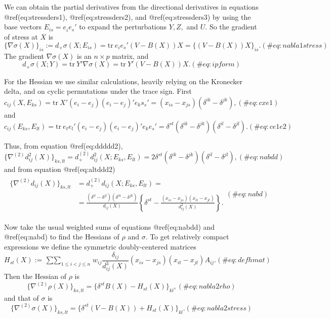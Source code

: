 \documentclass[
  12pt,
  letterpaper,
  DIV=11,
  numbers=noendperiod]{scrreprt}
\theoremstyle{remark}
\begin{document}
We can obtain the partial derivatives from the directional derivatives
in equations @ref(eq:stressders1), @ref(eq:stressders2), and
@ref(eq:stressders3) by using the base vectors \(E_{is}=e_i^{\ }e_s'\)
to expand the perturbations \(Y, Z,\) and \(U\). So the gradient of
stress at \(X\) is\\
\begin{equation}
\{\nabla\sigma(X)\}_{is}:=d_+\sigma(X;E_{is})=\text{tr}\ e_ie_s'(V-B(X))X=\{(V-B(X))X\}_{is}.
(\#eq:nabla1stress)
\end{equation} The gradient \(\nabla\sigma(X)\) is an \(n\times p\)
matrix, and \begin{equation}
d_+\sigma(X;Y)=\text{tr}\ Y'\nabla\sigma(X)=\text{tr}\ Y'(V-B(X))X.
(\#eq:ipform)
\end{equation}

For the Hessian we use similar calculations, heavily relying on the
Kronecker delta, and on cyclic permutations under the trace sign. First
\begin{equation}
c_{ij}(X,E_{ks})=\text{tr}\ X'(e_i-e_j)(e_i-e_j)'e_ks_s'=(x_{is}-x_{js})(\delta^{ik}-\delta^{jk}),
(\#eq:cxe1)
\end{equation} and \begin{equation}
c_{ij}(E_{ks},E_{lt})=\text{tr}\ e_te_l'(e_i-e_j)(e_i-e_j)'e_ke_s'=\delta^{st}(\delta^{ik}-\delta^{jk})(\delta^{il}-\delta^{jl}).
(\#eq:ce1e2)
\end{equation}

Thus, from equation @ref(eq:ddddd2), \begin{equation}
\{\nabla^{(2)}d_{ij}^2(X)\}_{ks,lt}=d_+^{(2)}d_{ij}^2(X;E_{ks},E_{lt})=2\delta^{st}(\delta^{ik}-\delta^{jk})(\delta^{il}-\delta^{jl}),(\#eq:nabdd)
\end{equation} and from equation @ref(eq:altddd2) \begin{align}
\begin{split}
\{\nabla^{(2)}d_{ij}(X)\}_{ks,lt}&=d_+^{(2)}d_{ij}(X;E_{ks},E_{lt})=\\&=\frac{(\delta^{il}-\delta^{jl})(\delta^{ik}-\delta^{jk})}{d_{ij}(X)}\left\{\delta^{st}-\frac{(x_{is}-x_{js})(x_{it}-x_{jt})}{d_{ij}^2(X)}\right\}.
\end{split}(\#eq:nabd)
\end{align}

Now take the usual weighted sums of equations @ref(eq:nabdd) and
@ref(eq:nabd) to find the Hessians of \(\rho\) and \(\sigma\). To get
relatively compact expressions we define the symmetric doubly-centered
matrices \begin{equation}
H_{st}(X):=\mathop{\sum\sum}_{1\leq i<j\leq n}w_{ij}\frac{\delta_{ij}}{d_{ij}^3(X)}(x_{is}-x_{js})(x_{it}-x_{jt})A_{ij}.
(\#eq:defhmat)
\end{equation} Then the Hessian of \(\rho\) is \begin{equation}
\{\nabla^{(2)}\rho(X)\}_{ks,lt}=\{\delta^{st}B(X)-H_{st}(X)\}_{kl},
(\#eq:nabla2rho)
\end{equation} and that of \(\sigma\) is \begin{equation}
\{\nabla^{(2)}\sigma(X)\}_{ks,lt}=\{\delta^{st}(V-B(X))+H_{st}(X)\}_{kl}.
(\#eq:nabla2stress)
\end{equation}
\end{document}
